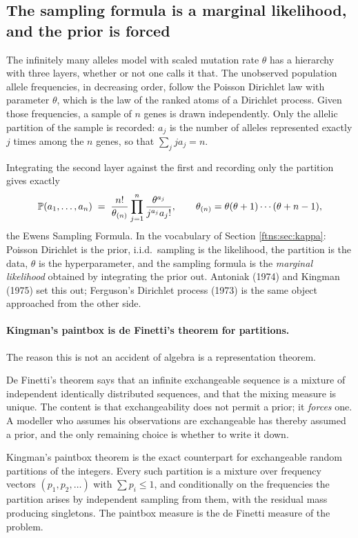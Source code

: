 \subsection{The sampling formula is a marginal likelihood, and the prior is forced}

The infinitely many alleles model with scaled mutation rate $\theta$ has a hierarchy with three
layers, whether or not one calls it that. The unobserved population allele frequencies, in
decreasing order, follow the Poisson Dirichlet law with parameter $\theta$, which is the law of
the ranked atoms of a Dirichlet process. Given those frequencies, a sample of $n$ genes is drawn
independently. Only the allelic partition of the sample is recorded: $a_j$ is the number of alleles represented exactly $j$ times among the $n$ genes, so that $\sum_jja_j=n$.

Integrating the second layer against the first and recording only the partition gives exactly
\[
\mathbb{P}(a_1,\dots,a_n)\;=\;\frac{n!}{\theta_{(n)}}\prod_{j=1}^{n}\frac{\theta^{a_j}}{j^{a_j}a_j!},
\qquad \theta_{(n)}=\theta(\theta+1)\cdots(\theta+n-1),
\]
the Ewens Sampling Formula. In the vocabulary of Section \ref{ftns:sec:kappa}: Poisson Dirichlet is the
prior, i.i.d.\ sampling is the likelihood, the partition is the data, $\theta$ is the
hyperparameter, and the sampling formula is the \emph{marginal likelihood} obtained by integrating
the prior out. Antoniak (1974) and Kingman (1975) set this out; Ferguson's Dirichlet process (1973)
is the same object approached from the other side.

\paragraph{Kingman's paintbox is de Finetti's theorem for partitions.} The reason this is not an accident of algebra is a representation theorem.

De Finetti's theorem says that an infinite exchangeable sequence is a mixture of independent
identically distributed sequences, and that the mixing measure is unique. The content is that
exchangeability does not permit a prior; it \emph{forces} one. A modeller who assumes his
observations are exchangeable has thereby assumed a prior, and the only remaining choice is whether
to write it down.

Kingman's paintbox theorem is the exact counterpart for exchangeable random partitions of the
integers. Every such partition is a mixture over frequency vectors $(p_1,p_2,\dots)$ with
$\sum p_i\le1$, and conditionally on the frequencies the partition arises by independent sampling
from them, with the residual mass producing singletons. The paintbox measure is the de Finetti
measure of the problem.

